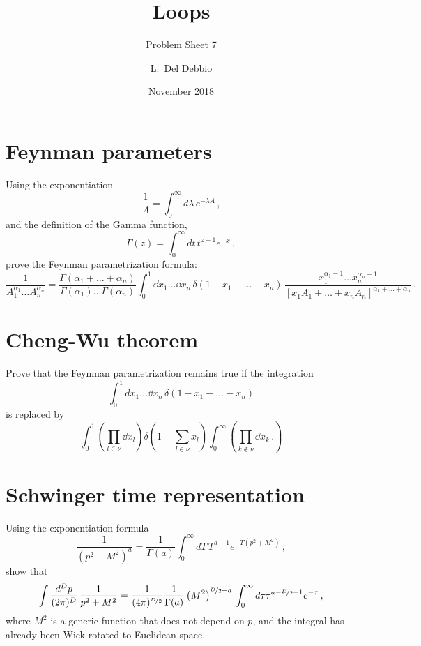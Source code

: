 \documentclass{tutorial}
\subtitle{Problem Sheet 7}
\title{Loops}
\author{L.~Del Debbio}
\date{November 2018}
\begin{document}
\maketitle

\section{ Feynman parameters}

  Using the exponentiation
  \[
    \frac{1}{A} = \int_0^\infty d\lambda\, e^{-\lambda A}\, ,
  \]
  and the definition of the Gamma function,
  \[
    \Gamma(z) = \int_0^\infty dt\, t^{z-1} e^{-x}\, ,
  \]
  prove the Feynman parametrization formula:
  \[
    \frac{1}{A_1^{\alpha_1} \ldots A_n^{\alpha_n}} =
    \frac{\Gamma(\alpha_1+\ldots+\alpha_n)}{\Gamma(\alpha_1) \ldots
      \Gamma(\alpha_n)} \int_0^1\dd{x_1} \ldots \dd{x_n}\,
    \delta(1-x_1-\ldots -x_n)\,
    \frac{x_1^{\alpha_1-1} \ldots x_n^{\alpha_n-1}}{\left[x_1 A_1 +
        \ldots + x_n A_n\right]^{\alpha_1+\ldots +\alpha_n}}\, .
  \]

  \bigskip
  
\section{ Cheng-Wu theorem}

  Prove that the Feynman parametrization remains true if the
  integration
  \[
    \int_0^1dx_1 \ldots \dd{x_n}\,
    \delta(1-x_1-\ldots -x_n)
  \]
  is replaced by
  \[
    \int_0^1 \left(\prod_{l\in\nu} \dd{x_l}\right)
    \delta\left(1-\sum_{l\in\nu}x_l\right)
    \int_0^\infty \left(
      \prod_{k\not\in\nu}\dd{x_k}\, .
    \right)
  \]

  \bigskip

\section{ Schwinger time representation}

  Using the exponentiation formula
  \[
    \frac{1}{(p^2+M^2)^a} = \frac{1}{\Gamma(a)} \int_0^\infty dT\,
    T^{a-1} e^{-T (p^2+M^2)}\, ,
  \]
  show that
  \[
    \int \frac{d^Dp}{(2\pi)^D}\, \frac{1}{p^2+M^2} =
    \frac{1}{(4\pi)^{\nicefrac{D}{2}}}  \frac{1}{\Gamma(a)} \left(M^2\right)^{\nicefrac{D}{2}-a}\, \int_0^\infty
    d\tau \tau^{a-\nicefrac{D}{2}-1} e^{-\tau}\, ,
  \]
  where $M^2$ is a generic function that does not depend on $p$, and
  the integral has already been Wick rotated to Euclidean space.
\end{document}

